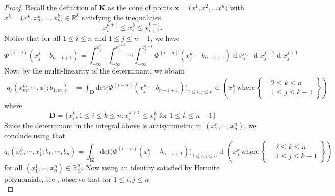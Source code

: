 \documentclass[11pt, reqno]{amsart}
\numberwithin{equation}{section}
\newcommand{\R}{\ensuremath{\mathbb{R}}}
\newcommand{\diff}{\ensuremath{\operatorname{d}\!}}
\begin{document}
\begin{proof}
Recall the definition of ${\mathbf K}$ as the cone of  points $\mathbf{x}= 
\bigl(x^{1},x^{2}, \ldots x^{n}\bigr)$ with  $x^{k}=\bigl(x^{k}_1,x^{k}_2, \ldots ,x^{k}_k\bigr) \in {\R}^k$ satisfying 
the inequalities 
\begin{equation*}
 x^{k+1}_{i} \leq x^{k}_i \leq x^{k+1}_{i+1}.
\end{equation*}
Notice that for all $1\le i \le n$ and $1\le j \le n-1$, we have 
\begin{equation*}
    \Phi^{(i-j)}(x^j_j-b_{n-i+1}) = \displaystyle\int^{x^j_j}_{-\infty}\int^{x^{j+1}_{j}}_{-\infty}\cdots\displaystyle\int^{x^{n-1}_j}_{-\infty}\Phi^{(i-n)}(x^n_j-b_{n-i+1}) \diff x^n_{j}\cdots \diff x^{j+2}_j \diff x^{j+1}_j
\end{equation*}
Now, by the multi-linearity of the determinant, we obtain
\begin{equation*}
\begin{array}{cc}
    q_\ell(x^m_m, \cdots, x^1_1; b_{1:m}) & = \displaystyle\int_{\boldsymbol{D}}\mathrm{det}\big(\Phi^{(i-n)}(x^n_j-b_{n-i+1})\big)_{1\le i, j\le n} \diff\, \left(x^k_j\, \mathrm{where}\, \left.\begin{cases}
       &2\le k \le n\\
       &1\le j \le k-1
   \end{cases}\right\} \right)
    \end{array}
\end{equation*}
where
\begin{equation*}
    \boldsymbol{D} = \{x^k_i, 1\le i\le k \le n :  x^{k+1}_i\le x^k_i\; \mathrm{for }\; 1\le k \le n-1 \}
\end{equation*}
Since the determinant in the integral above is antisymmetric in $(x_1^n, \cdots, x^n_n)$, we conclude using \cite[Lemma 5.6]{Weiss_2017} that 
\begin{equation*}
   q_{\ell}(x^n_n, \cdots, x^1_1; b_1, \cdots, b_n) = \displaystyle \int_{\boldsymbol{K}}\mathrm{det}\big(\Phi^{(i-n)}(x^n_j-b_{n-i+1})\big)_{1\le i, j\le n}\diff\, \left(x^k_j\, \mathrm{where}\, \left.\begin{cases}
       &2\le k \le n\\
       &1\le j \le k-1
   \end{cases}\right\} \right)
\end{equation*}
for all $(x^1_1, \cdots, x^n_n)\in \R^n_{\le}$. Now using an identity satisfied by Hermite polynomials, see \cite{weisstein2002hermite}, observe that for $1\le i, j \le n$
\begin{equation*}

\end{equation*}
\end{proof}
\end{document}
